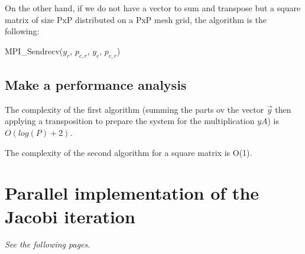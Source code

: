 On the other hand, if we do not have a vector to sum and transpose but a square matrix of size PxP distributed on a PxP mesh grid, the algorithm is the following:

\begin{algorithmic}
 
    \State MPI\_Sendrecv($y_r$, $p_{c,r}$, $y_c$, $p_{c,r}$) 
\EndIf
\end{algorithmic}

\subsection{Make a performance analysis}
The complexity of the first algorithm (summing the parts ov the vector $\vec{y}$ then applying a transposition to prepare the system for the multiplication $yA$) is $O(log(P) + 2)$.

The complexity of the second algorithm for a square matrix is O(1).


\section{Parallel implementation of the Jacobi iteration}
\textit{See the following pages.}

